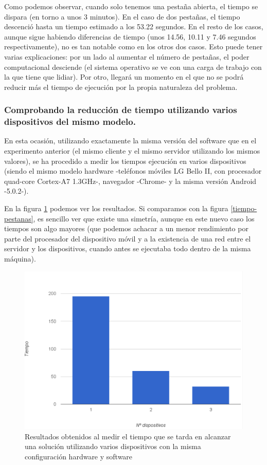 \documentclass[runningheads,a4paper]{llncs}
\begin{document}
Como podemos observar, cuando solo tenemos una pesta\~na abierta, el tiempo se
dispara (en torno a unos 3 minutos). En el caso de dos pesta\~nas, el tiempo descenci\'o hasta
un tiempo estimado a los 53.22 segundos. En el resto de los casos, aunque sigue habiendo
diferencias de tiempo (unos 14.56, 10.11 y 7.46 segundos respectivamente), no es
tan notable como en los otros dos casos. Esto puede tener varias explicaciones: por un
lado al aumentar el n\'umero de pesta\~nas, el poder computacional desciende (el
sistema operativo se ve con una carga de trabajo con la que tiene que lidiar).
Por otro, llegar\'a un momento en el que no se podr\'a reducir m\'as el tiempo
de ejecuci\'on por la propia naturaleza del problema.


\subsubsection{Comprobando la reducci\'on de tiempo utilizando varios dispositivos del mismo modelo.}

En esta ocasi\'on, utilizando exactamente la misma versi\'on del software que en
el experimento anterior (el mismo cliente y el mismo servidor utilizando los mismos valores),
se ha procedido a medir los tiempos ejecuci\'on en varios dispositivos (siendo el mismo
modelo hardware -tel\'efonos m\'oviles LG Bello II, con procesador quad-core
Cortex-A7 1.3GHz-, navegador -Chrome- y la misma versi\'on Android -5.0.2-).

En la figura \ref{tiempo-dispositivos} podemos ver los resultados.  Si comparamos con
la figura \ref{tiempo-pestanas}, es sencillo ver que existe una simetr\'ia, aunque
en este nuevo caso los tiempos son algo mayores (que podemos achacar a un menor rendimiento
por parte del procesador del dispositivo m\'ovil y a la existencia de una red entre
el servidor y los dispositivos, cuando antes se ejecutaba todo dentro de la misma
m\'aquina).

\begin{figure}[htbp]
\includegraphics[scale=0.6]{img/tiempo-dispositivos}
\centering
\caption{Resultados obtenidos al medir el tiempo que se tarda en alcanzar una
soluci\'on utilizando varios dispositivos con la misma configuraci\'on hardware y software}
\label{tiempo-dispositivos}
\end{figure}
\end{document}
